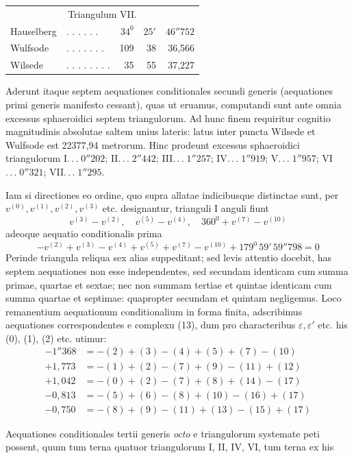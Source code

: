 \begin{center}
\begin{tabular}{l l r r r}
\multicolumn{5}{c}{Triangulum VII.}\\[5pt]
Hauselberg&. . . . . .&\(34^0\)&\(25'\)&\(46''752\)\\
Wulfsode&. . . . . . .&109&38&36,566\\
Wilsede&. . . . . . . .&35&55&37,227
\end{tabular}
\end{center}

Aderunt itaque septem aequationes conditionales secundi generis (aequationes primi generis manifesto cessant), quas ut eruamus, computandi sunt ante omnia excessus sphaeroidici septem triangulorum. Ad hunc finem requiritur cognitio magnitudinis absolutae saltem unius lateris: latus inter puncta Wilsede et Wulfsode est 22377,94 metrorum. Hinc prodeunt excessus sphaeroidici triangulorum I\(.\,.\,.\;0''202\); II\(.\,.\,.\;2''442\); III\(.\,.\,.\;1''257\); IV\(.\,.\,.\;1''919\); V\(.\,.\,.\;1''957\); VI\(.\,.\,.\;0''321\); VII\(.\,.\,.\;1''295\).

Iam si directiones eo ordine, quo supra allatae indicibusque distinctae sunt, per \(v^{(0)},v^{(1)},v^{(2)},v^{(3)}\) etc. designantur, trianguli I anguli fiunt
\[
v^{(3)}-v^{(2)},\quad v^{(5)}-v^{(4)},\quad 360^0+v^{(7)}-v^{(10)}
\]
adeoque aequatio conditionalis prima
\[
-v^{(2)}+v^{(3)}-v^{(4)}+v^{(5)}+v^{(7)}-v^{(10)}+179^0\,59'\,59''798=0
\]
Perinde triangula reliqua sex alias suppeditant; sed levis attentio docebit, has septem aequationes non esse independentes, sed secundam identicam cum summa primae, quartae et sextae; nec non summam tertiae et quintae identicam cum summa quartae et septimae: quapropter secundam et quintam negligemus. Loco remanentium aequationum conditionalium in forma finita, adscribimus aequationes correspondentes e complexu (13), dum pro characteribus \(\varepsilon,\varepsilon'\) etc. his (0), (1), (2) etc. utimur:
\[
\begin{aligned}
-1''368&=-(2)+(3)-(4)+(5)+(7)-(10)\\
+1{,}773&=-(1)+(2)-(7)+(9)-(11)+(12)\\
+1{,}042&=-(0)+(2)-(7)+(8)+(14)-(17)\\
-0{,}813&=-(5)+(6)-(8)+(10)-(16)+(17)\\
-0{,}750&=-(8)+(9)-(11)+(13)-(15)+(17)
\end{aligned}
\]

Aequationes conditionales tertii generis \textit{octo} e triangulorum systemate peti possent, quum tum terna quatuor triangulorum I, II, IV, VI, tum terna ex his
